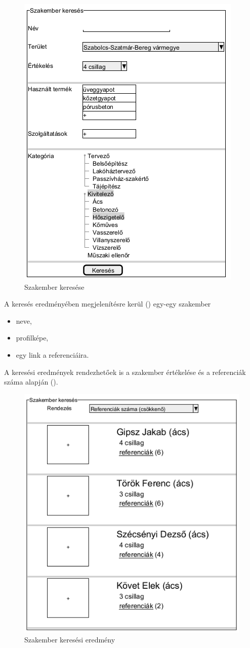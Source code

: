 \begin{figure}[h]
	\centering
	\includegraphics[scale=0.6]{img/szakember_keres.png}
	\caption{Szakember keresése}
	\label{fig:szak_ker}
\end{figure}

A keresés eredményében megjelenítésre kerül () egy-egy szakember
\begin{itemize}
     \item neve,
     \item profilképe,
     \item egy link a referenciáira.
\end{itemize}

A keresési eredmények rendezhetőek is a szakember értékelése és a referenciák száma alapján ().

\begin{figure}[h]
	\centering
	\includegraphics[scale=0.6]{img/szakember_eredmeny.png}
	\caption{Szakember keresési eredmény}
	\label{fig:szak_ker_ered}
\end{figure}